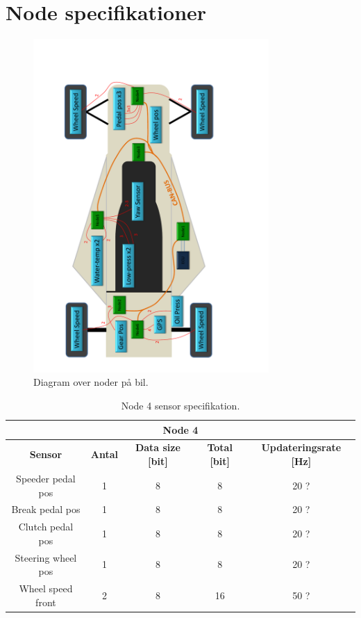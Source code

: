 \section{Node specifikationer}

\begin{figure}[H]
	\centering
	\includegraphics[width=0.8\textwidth, angle=270]{../software/noder/diagram_car.pdf}
	\caption{Diagram over noder på bil.\label{fig:bil_diagram}}
\end{figure}

\begin{table}[H] \centering
	\begin{tabular}{|c|c|c|c|c|}
        \hline \multicolumn{5}{|c|}{\textbf{Node 4}} \\
	    \hline \hline \textbf{Sensor} & \textbf{Antal} & \textbf{Data size [bit]} & \textbf{Total [bit]} & \textbf{Updateringsrate [Hz]}\\
        \hline Speeder pedal pos & 1 & 8 & 8 & 20 ? \\
        \hline Break pedal pos & 1 & 8 & 8 & 20 ? \\
        \hline Clutch pedal pos & 1 & 8 & 8 & 20 ? \\
        \hline Steering wheel pos & 1 & 8 & 8 & 20 ? \\
        \hline Wheel speed front & 2 & 8 & 16 & 50 ? \\
        \hline
    \end{tabular}
\caption{Node 4 sensor specifikation.}
\label{table:CAN_node4}
\end{table}

